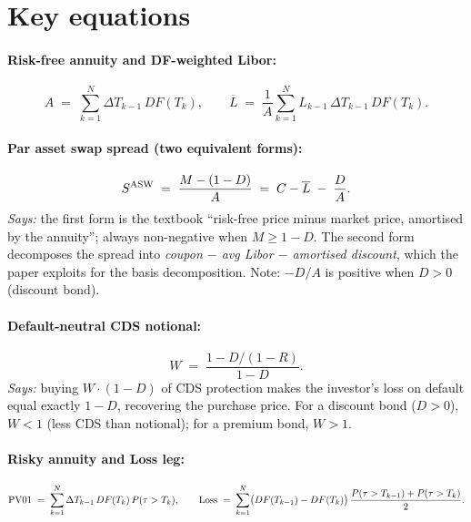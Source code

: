 \documentclass[11pt,a4paper]{article}
\begin{document}
\section{Key equations}

\paragraph{Risk-free annuity and DF-weighted Libor:}
\begin{equation}\label{eq:zhou-A-L}
  A \;=\; \sum_{k=1}^{N} \Delta T_{k-1}\, DF(T_k), \qquad
  \overline L \;=\; \frac{1}{A} \sum_{k=1}^{N} L_{k-1}\, \Delta T_{k-1}\, DF(T_k).
\end{equation}

\paragraph{Par asset swap spread (two equivalent forms):}
\begin{equation}\label{eq:zhou-asw}
  S^{\mathrm{ASW}} \;=\; \frac{M - (1 - D)}{A} \;=\; C - \overline L \;-\; \frac{D}{A}.
\end{equation}
\textit{Says:} the first form is the textbook ``risk-free price minus
market price, amortised by the annuity''; always non-negative when
$M \ge 1 - D$. The second form decomposes the spread into
\emph{coupon $-$ avg Libor $-$ amortised discount}, which the paper
exploits for the basis decomposition. Note: $-D/A$ is positive when
$D > 0$ (discount bond).

\paragraph{Default-neutral CDS notional:}
\begin{equation}\label{eq:zhou-W}
  W \;=\; \frac{1 - D / (1 - R)}{1 - D}.
\end{equation}
\textit{Says:} buying $W \cdot (1 - D)$ of CDS protection makes the
investor's loss on default equal exactly $1 - D$, recovering the
purchase price. For a discount bond ($D > 0$), $W < 1$ (less CDS than
notional); for a premium bond, $W > 1$.

\paragraph{Risky annuity and Loss leg:}
\begin{equation}\label{eq:zhou-pv-loss}
  \mathrm{PV01} \;=\; \sum_{k=1}^{N} \Delta T_{k-1}\, DF(T_k)\, P(\tau > T_k), \qquad
  \mathrm{Loss} \;=\; \sum_{k=1}^{N} \bigl(DF(T_{k-1}) - DF(T_k)\bigr)\, \frac{P(\tau > T_{k-1}) + P(\tau > T_k)}{2}.
\end{equation}
\end{document}

